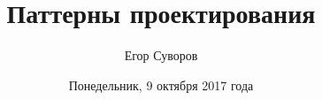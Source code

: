 \documentclass[utf8,xcolor=table]{beamer}
\title{Паттерны проектирования}
\author{Егор Суворов}
\institute[СПб АУ]{Курс <<Парадигмы и языки программирования>>, подгруппа 3}
\date[09.10.2016]{Понедельник, 9 октября 2017 года}
\begin{document}
\begin{frame}
\titlepage
\end{frame}



\end{document}

